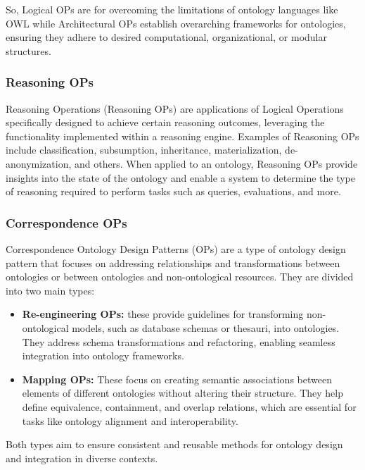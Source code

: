 So, Logical OPs are for overcoming the limitations of ontology languages like OWL while Architectural OPs establish overarching frameworks for ontologies, ensuring they adhere to desired computational, organizational, or modular structures.

\subsubsection{Reasoning OPs}
Reasoning Operations (Reasoning OPs) are applications of Logical Operations specifically designed to achieve certain reasoning outcomes, leveraging the functionality implemented within a reasoning engine. Examples of Reasoning OPs include classification, subsumption, inheritance, materialization, de-anonymization, and others. When applied to an ontology, Reasoning OPs provide insights into the state of the ontology and enable a system to determine the type of reasoning required to perform tasks such as queries, evaluations, and more. 

\subsubsection{Correspondence OPs}
Correspondence Ontology Design Patterns (OPs) are a type of ontology design pattern that focuses on addressing relationships and transformations between ontologies or between ontologies and non-ontological resources. They are divided into two main types:
\begin{itemize}
    \item \textbf{Re-engineering OPs:} these provide guidelines for transforming non-ontological models, such as database schemas or thesauri, into ontologies. They address schema transformations and refactoring, enabling seamless integration into ontology frameworks.

    \item \textbf{Mapping OPs:} These focus on creating semantic associations between elements of different ontologies without altering their structure. They help define equivalence, containment, and overlap relations, which are essential for tasks like ontology alignment and interoperability.
\end{itemize}
Both types aim to ensure consistent and reusable methods for ontology design and integration in diverse contexts. 

